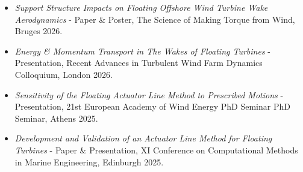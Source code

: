 \documentclass{cv}
\begin{document}
\begin{itemize}
	\item \textit{Support Structure Impacts on Floating Offshore Wind Turbine Wake Aerodynamics} - Paper \& Poster, The Science of Making Torque from Wind, Bruges 2026.
	\item \textit{Energy \& Momentum Transport in The Wakes of Floating Turbines} - Presentation, Recent Advances in Turbulent Wind Farm Dynamics Colloquium, London 2026. 
	\item \textit{Sensitivity of the Floating Actuator Line Method to Prescribed Motions} - Presentation, 21st European Academy of Wind Energy PhD Seminar PhD Seminar, Athens 2025.
	\item \textit{Development and Validation of an Actuator Line Method for Floating Turbines} - Paper \& Presentation, XI Conference on Computational Methods in Marine Engineering, Edinburgh 2025.
\end{itemize}
\end{document}
